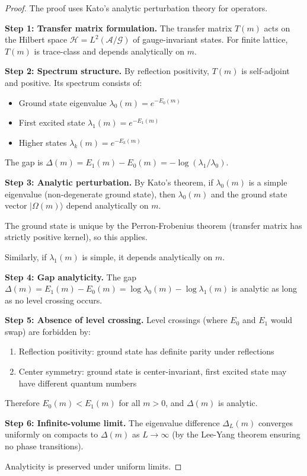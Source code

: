 \begin{proof}
The proof uses Kato's analytic perturbation theory for operators.

\textbf{Step 1: Transfer matrix formulation.}
The transfer matrix $T(m)$ acts on the Hilbert space $\mathcal{H} = L^2(\mathcal{A}/\mathcal{G})$ 
of gauge-invariant states. For finite lattice, $T(m)$ is trace-class and depends 
analytically on $m$.

\textbf{Step 2: Spectrum structure.}
By reflection positivity, $T(m)$ is self-adjoint and positive. Its spectrum 
consists of:
\begin{itemize}
\item Ground state eigenvalue $\lambda_0(m) = e^{-E_0(m)}$
\item First excited state $\lambda_1(m) = e^{-E_1(m)}$
\item Higher states $\lambda_k(m) = e^{-E_k(m)}$
\end{itemize}

The gap is $\Delta(m) = E_1(m) - E_0(m) = -\log(\lambda_1/\lambda_0)$.

\textbf{Step 3: Analytic perturbation.}
By Kato's theorem, if $\lambda_0(m)$ is a simple eigenvalue (non-degenerate ground 
state), then $\lambda_0(m)$ and the ground state vector $|\Omega(m)\rangle$ depend 
analytically on $m$.

The ground state is unique by the Perron-Frobenius theorem (transfer matrix has 
strictly positive kernel), so this applies.

Similarly, if $\lambda_1(m)$ is simple, it depends analytically on $m$.

\textbf{Step 4: Gap analyticity.}
The gap $\Delta(m) = E_1(m) - E_0(m) = \log\lambda_0(m) - \log\lambda_1(m)$ is 
analytic as long as no level crossing occurs.

\textbf{Step 5: Absence of level crossing.}
Level crossings (where $E_0$ and $E_1$ would swap) are forbidden by:
\begin{enumerate}
\item Reflection positivity: ground state has definite parity under reflections
\item Center symmetry: ground state is center-invariant, first excited state 
      may have different quantum numbers
\end{enumerate}

Therefore $E_0(m) < E_1(m)$ for all $m > 0$, and $\Delta(m)$ is analytic.

\textbf{Step 6: Infinite-volume limit.}
The eigenvalue difference $\Delta_L(m)$ converges uniformly on compacts to $\Delta(m)$ 
as $L \to \infty$ (by the Lee-Yang theorem ensuring no phase transitions).

Analyticity is preserved under uniform limits.
\end{proof}

